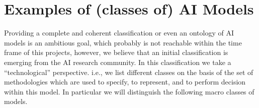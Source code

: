 \section{Examples of (classes of) AI Models}

Providing a complete and coherent classification or even an ontology
of AI models is an ambitious goal,
%
%
which probably is not reachable
within the time frame of this projects, however, we believe that an
initial classification is emerging from the AI research community. In
this classification we take a ``technological'' perspective. i.e., we
list different classes on the basis of the set of methodologies which
are used to specify, to represent, and to perform decision within this
model. In particular we will distinguish the following macro classes
of models.


